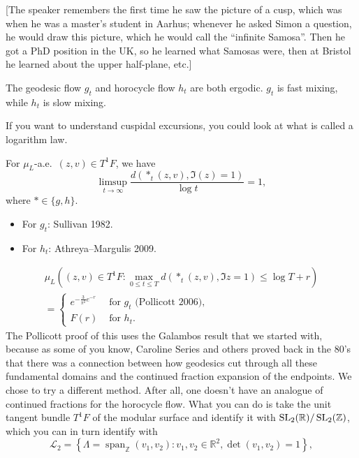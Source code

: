 \documentclass[reqno]{amsart} 
\numberwithin{theorem}{section}
\numberwithin{equation}{section}
\begin{document}
[The speaker remembers the first time he saw the picture of a cusp, which was when he was a master's student in Aarhus; whenever he asked Simon a question, he would draw this picture, which he would call the ``infinite Samosa''.  Then he got a PhD position in the UK, so he learned what Samosas were, then at Bristol he learned about the upper half-plane, etc.]

The geodesic flow $g_t$ and horocycle flow $h_t$ are both ergodic.  $g_t$ is fast mixing, while $h_t$ is slow mixing.

If you want to understand cuspidal excursions, you could look at what is called a logarithm law.

For $\mu_L$-a.e.\ $(z, v) \in T^1 F$, we have
\begin{equation*}
  \limsup_{t \rightarrow \infty}
  \frac{d(\ast_t(z, v), \Im(z) = 1)}{\log t} = 1,
\end{equation*}
where $\ast \in \{g, h\}$.
\begin{itemize}
\item For $g_t$: Sullivan 1982.
\item For $h_t$: Athreya--Margulis 2009.
\end{itemize}
\begin{multline*}
  \mu_L \left((z, v) \in T^1 F : \max_{0 \leq t \leq T} d \left( \ast_t(z, v), \Im z = 1 \right)
    \leq
    \log T + r
  \right)
  \\
  =
  \begin{cases}
    e^{- \tfrac{3}{\pi^2} e^{- r}} & \text{ for $g_t$ (Pollicott 2006)}, \\
    F(r)                                 & \text{ for } h_t.
  \end{cases}
\end{multline*}
The Pollicott proof of this uses the Galambos result that we started with, because as some of you know, Caroline Series and others proved back in the 80's that there was a connection between how geodesics cut through all these fundamental domains and the continued fraction expansion of the endpoints.  We chose to try a different method.  After all, one doesn't have an analogue of continued fractions for the horocycle flow.  What you can do is take the unit tangent bundle $T^1 F$ of the modular surface and identify it with $\operatorname{SL}_2(\mathbb{R}) / \operatorname{SL}_2(\mathbb{Z})$, which you can in turn identify with
\begin{equation*}
  \mathcal{L}_2 = \left\{ \Lambda = \operatorname{span}_{\mathbb{Z}}(v_1, v_2) : v_1, v_2 \in \mathbb{R}^2, \det(v_1, v_2) = 1 \right\},
\end{equation*}
\end{document}
